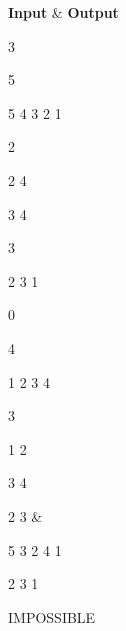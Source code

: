 \begin{tabular}\hline 
\textbf{Input}\textbf{} & \textbf{Outp}\textbf{ut}  
\hline


3

5

5 4 3 2 1

2

2 4

3 4

3

2 3 1

0

4

1 2 3 4

3

1 2

3 4

 2 3 & 

5 3 2 4 1

2 3 1

 IMPOSSIBLE \\ 
\hline

\end{tabular}